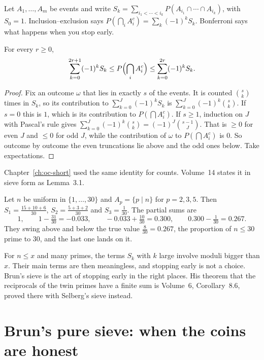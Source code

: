 Let $A_1,\dots,A_m$ be events and write $S_k=\sum_{i_1<\cdots<i_k}P(A_{i_1}\cap\cdots\cap A_{i_k})$, with $S_0=1$. Inclusion--exclusion says $P(\bigcap_iA_i^c)=\sum_k(-1)^kS_k$. Bonferroni says what happens when you stop early.

\begin{theorem}[Bonferroni]\label{thm:bonferroni}
For every $r\ge0$,
\[
\sum_{k=0}^{2r+1}(-1)^k S_k\le P\Bigl(\bigcap_i A_i^c\Bigr)\le\sum_{k=0}^{2r}(-1)^k S_k.
\]
\end{theorem}
\begin{proof}
Fix an outcome $\omega$ that lies in exactly $s$ of the events. It is counted $\binom sk$ times in $S_k$, so its contribution to $\sum_{k=0}^J(-1)^kS_k$ is $\sum_{k=0}^J(-1)^k\binom sk$. If $s=0$ this is $1$, which is its contribution to $P(\bigcap A_i^c)$. If $s\ge1$, induction on $J$ with Pascal's rule gives $\sum_{k=0}^J(-1)^k\binom sk=(-1)^J\binom{s-1}J$. That is $\ge0$ for even $J$ and $\le0$ for odd $J$, while the contribution of $\omega$ to $P(\bigcap A_i^c)$ is $0$. So outcome by outcome the even truncations lie above and the odd ones below. Take expectations.
\end{proof}

Chapter~\ref{ch:oc-short} used the same identity for counts. Volume~14 states it in sieve form as Lemma~3.1.

\begin{examplex}
Let $n$ be uniform in $\{1,\dots,30\}$ and $A_p=\{p\mid n\}$ for $p=2,3,5$. Then $S_1=\frac{15+10+6}{30}$, $S_2=\frac{5+3+2}{30}$ and $S_3=\frac1{30}$. The partial sums are
\[
1,\qquad1-\tfrac{31}{30}=-0.033,\qquad-0.033+\tfrac{10}{30}=0.300,\qquad0.300-\tfrac1{30}=0.267.
\]
They swing above and below the true value $\frac8{30}=0.267$, the proportion of $n\le30$ prime to $30$, and the last one lands on it.
\end{examplex}

For $n\le x$ and many primes, the terms $S_k$ with $k$ large involve moduli bigger than $x$. Their main terms are then meaningless, and stopping early is not a choice. Brun's sieve is the art of stopping early in the right places. His theorem that the reciprocals of the twin primes have a finite sum is Volume~6, Corollary~8.6, proved there with Selberg's sieve instead.

\section{Brun's pure sieve: when the coins are honest}

